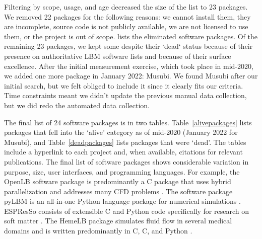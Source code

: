 \documentclass[final, 3p, times, authoryear]{elsarticle}
\newcommand{\CC}{C\nolinebreak\hspace{-.05em}\raisebox{.4ex}{\small\bf
+}\nolinebreak\hspace{-.10em}\raisebox{.4ex}{\small\bf +}}
\begin{document}
Filtering by scope, usage, and age decreased the size of the list to 23
packages. We removed 22 packages for the following reasons: we cannot install
them, they are incomplete, source code is not publicly available, we are not
licensed to use them, or the project is out of scope. \citet{Michalski2021}
lists the eliminated software packages. Of the remaining 23 packages, we kept
some despite their `dead` status because of their presence on authoritative LBM
software lists and because of their surface excellence. After the initial
measurement exercise, which took place in mid-2020, we added one more package in
January 2022: Musubi. We found Musubi after our initial search, but we felt
obliged to include it since it clearly fits our criteria. Time constraints meant
we didn't update the previous manual data collection, but we did redo the
automated data collection.

The final list of 24 software packages is in two tables.
Table~\ref{alivepackages} lists packages that fell into the `alive' category as
of mid-2020 (January 2022 for Musubi), and Table~\ref{deadpackages} lists
packages that were `dead'. The tables include a hyperlink to each project and,
when available, citations for relevant publications.  The final list of software
packages shows considerable variation in purpose, size, user interfaces, and
programming languages. For example, the OpenLB software package is predominantly
a \CC{} package that uses hybrid parallelization and addresses many CFD problems
\citep{heuveline2009towards}. The software package pyLBM is an all-in-one Python
language package for numerical simulations \citep{graille2017pylbm}. ESPResSo
consists of extensible \CC{} and Python code specifically for research on soft
matter \citep{weik2019espresso}. The HemeLB package simulates fluid flow in
several medical domains and is written predominantly in C, \CC, and Python
\citep{mazzeo2008hemelb}.
\end{document}
